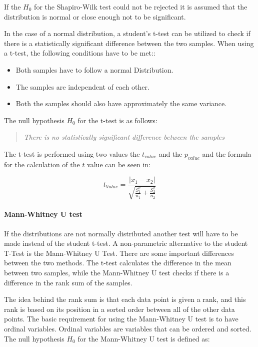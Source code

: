 If the $H_0$ for the Shapiro-Wilk test could not be rejected it is assumed that the distribution is normal or close enough not to be significant.\newline

In the case of a normal distribution, a student's t-test can be utilized to check if there is a statistically significant difference between the two samples. When using a t-test, the following conditions have to be met:\cite{kaur2015comparative}:

\begin{itemize}
    \item Both samples have to follow a normal Distribution.
    \item The samples are independent of each other.
    \item Both the samples should also have approximately the same variance.
\end{itemize}

The null hypothesis $H_0$ for the t-test is as follows:

\begin{quote}
    \textit{There is no statistically significant difference between the samples}    
\end{quote}

The t-test is performed using two values the $t_{value}$ and the $p_{value}$ and the formula for the calculation of the $t$ value can be seen in:

\begin{equation}
    t_{Value} = \frac{|\bar{x_1}- \bar{x_2}|}{\sqrt{\frac{S_1^2}{n_1} + \frac{S_2^2}{n_2}}}  
\end{equation}

\paragraph{Mann-Whitney U test}
If the distributions are not normally distributed another test will have to be made instead of the student t-test. A non-parametric alternative to the student T-Test is the Mann-Whitney U Test\cite{kaur2015comparative}. There are some important differences between the two methods. The t-test calculates the difference in the mean between two samples, while the Mann-Whitney U test checks if there is a difference in the rank sum of the samples.\cite{mann1947test}\newline

The idea behind the rank sum is that each data point is given a rank, and this rank is based on its position in a sorted order between all of the other data points. The basic requirement for using the Mann-Whitney U test is to have ordinal variables. Ordinal variables are variables that can be ordered and sorted. The null hypothesis $H_0$ for the Mann-Whitney U test is defined as:

